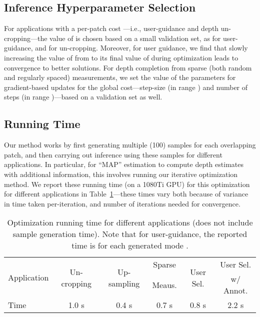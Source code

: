 \documentclass[10pt,twocolumn,letterpaper]{article}
\begin{document}
\subsection{Inference Hyperparameter Selection}
For applications with a per-patch cost ---i.e., user-guidance and depth un-cropping---the value of  is chosen based on a small validation set, as  for user-guidance, and  for un-cropping. Moreover, for user guidance, we find that slowly increasing the value of  from  to its final value of  during optimization leads to convergence to better solutions. For depth completion from sparse (both random and regularly spaced) measurements, we set the value of the parameters for gradient-based updates for the global cost---step-size  (in range ) and number of steps (in range )---based on a validation set as well.


\subsection{Running Time}
Our method works by first generating multiple (100) samples for each overlapping patch, and then carrying out inference using these samples for different applications. In particular, for ``MAP'' estimation to compute depth estimates with additional information, this involves running our iterative optimization method. We report these running time (on a 1080Ti GPU) for this optimization for different applications in Table~\ref{tab:runtime}---these times vary both because of variance in time taken per-iteration, and number of iterations needed for convergence.

\begin{table}[!t]\small
  \begin{center}
     \centering
     \begin{tabular}{lccccc}\toprule
       \multirow{2}{*}{Application}&\multirow{2}{*}{Un-cropping}&\multirow{2}{*}{Up-sampling}&Sparse&\multirow{2}{*}{User Sel.}&User Sel.\\
                                   & & & Meaus.& &w/ Annot.\\\midrule
       Time & 1.0 s & 0.4 s & 0.7 s & 0.8 s & 2.2 s\\\bottomrule
     \end{tabular}
   \end{center}
     \caption{Optimization running time for different applications (does not include sample generation time). Note that for user-guidance, the reported time is for each generated mode .}
  \label{tab:runtime}
\end{table}
\end{document}
